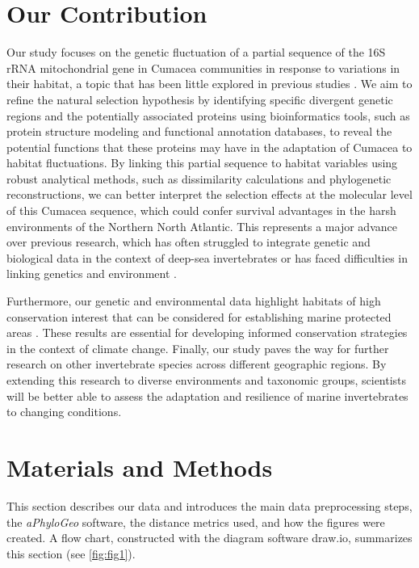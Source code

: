 \section{Our Contribution}\label{contribution}
Our study focuses on the genetic fluctuation of a partial sequence of the 16S rRNA mitochondrial gene in Cumacea communities in response to variations in their habitat, a topic that has been little explored in previous studies \citep{grassle1992deep, rex2000latitudinal}. We aim to refine the natural selection hypothesis by identifying specific divergent genetic regions and the potentially associated proteins using bioinformatics tools, such as protein structure modeling and functional annotation databases, to reveal the potential functions that these proteins may have in the adaptation of Cumacea to habitat fluctuations. By linking this partial sequence to habitat variables using robust analytical methods, such as dissimilarity calculations and phylogenetic reconstructions, we can better interpret the selection effects at the molecular level of this Cumacea sequence, which could confer survival advantages in the harsh environments of the Northern North Atlantic. This represents a major advance over previous research, which has often struggled to integrate genetic and biological data in the context of deep-sea invertebrates \citep{etter1990population, vrijenhoek2009cryptic} or has faced difficulties in linking genetics and environment \citep{manel2003landscape, balkenhol2009statistical}.

Furthermore, our genetic and environmental data highlight habitats of high conservation interest that can be considered for establishing marine protected areas \citep{levin2009ecological}. These results are essential for developing informed conservation strategies in the context of climate change. Finally, our study paves the way for further research on other invertebrate species across different geographic regions. By extending this research to diverse environments and taxonomic groups, scientists will be better able to assess the adaptation and resilience of marine invertebrates to changing conditions.

\section{Materials and Methods}\label{materials-methods}
This section describes our data and introduces the main data preprocessing steps, the \textit{aPhyloGeo} software, the distance metrics used, and how the figures were created. A flow chart, constructed with the diagram software draw.io, summarizes this section (see \autoref{fig:fig1}).

